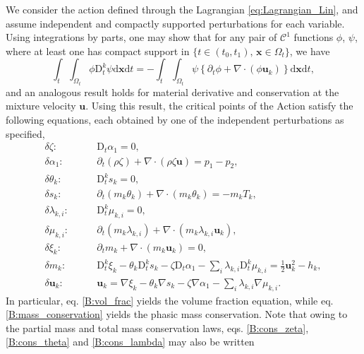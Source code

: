 \documentclass{myclass}
\newcommand{\Dt}{\mathrm{D}_t}
\newcommand{\vel}{\bm{u}}
\newcommand{\pth}[1]  {\left( #1 \right)}
\newcommand{\acco}[1]{\left\{ #1 \right\}}
\begin{document}
We consider the action defined through the Lagrangian \eqref{eq:Lagrangian_Lin}, and assume independent and compactly supported perturbations for each variable. Using integrations by parts, one may show that for any pair of $\mathscr{C}^1$ functions $\phi$, $\psi$, where at least one has compact support in $\{t\in(t_0,t_1),\, \bm{x}\in\Omega_t\}$, we have
\begin{equation}
\int_t\int_{\Omega_t} \phi\Dt^k\psi\mathrm{d}\bm{x}\mathrm{d}t = -\int_t\int_{\Omega_t} \psi\acco{\partial_t\phi + \nabla\cdot\pth{\phi \vel_k}}\mathrm{d}\bm{x}\mathrm{d}t,
\end{equation}
and an analogous result holds for material derivative and conservation at the mixture velocity $\vel$. Using this result, the critical points of the Action satisfy the following equations, each obtained by one of the independent perturbations as specified,
\begin{subequations}
\begin{align}
\delta\zeta: \qquad& \Dt\alpha_1=0,\label{B:vol_frac}\\
\delta\alpha_1: \qquad& \partial_t\pth{\rho\zeta} + \nabla\cdot\pth{\rho\zeta\vel} = p_1-p_2, \label{B:cons_zeta}\\
\delta\theta_k: \qquad& \Dt^k s_k =0,\\
\delta s_k: \qquad& \partial_t\pth{m_k\theta_k} + \nabla\cdot\pth{m_k\theta_k} = -m_k T_k, \label{B:cons_theta}\\
\delta \lambda_{k,i}: \qquad& \Dt^k\mu_{k,i}=0,\\
\delta \mu_{k,i}:  \qquad& \partial_t\pth{m_k\lambda_{k,i}} + \nabla\cdot\pth{m_k\lambda_{k,i}\vel_k},\label{B:cons_lambda}\\
\delta\xi_k: \qquad& \partial_t m_k + \nabla\cdot\pth{m_k\vel_k} =0,\label{B:mass_conservation}\\
\delta m_k: \qquad& \Dt^k\xi_k - \theta_k\Dt^k s_k - \zeta\Dt\alpha_1 - \sum_{i}\lambda_{k,i}\Dt^k\mu_{k,i} = \tfrac{1}{2}\vel_k^2 - h_k,\label{B:Dtkxik} \\
\delta \vel_k: \qquad & \vel_k = \nabla\xi_k - \theta_k\nabla s_k - \zeta\nabla\alpha_1 - \sum_i\lambda_{k,i}\nabla\mu_{k,i}.\label{B:vel_decomposition}
\end{align}
\end{subequations}
In particular, eq. \eqref{B:vol_frac} yields the volume fraction equation, while eq. \eqref{B:mass_conservation} yields the phasic mass conservation. Note that owing to the partial mass and total mass conservation laws, eqs. \eqref{B:cons_zeta}, \eqref{B:cons_theta} and \eqref{B:cons_lambda} may also be written
\end{document}
